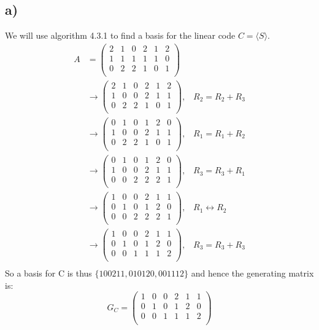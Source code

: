 \documentclass{article}
\begin{document}
\subsection*{a)}
We will use algorithm 4.3.1 to find a basis for the linear code $C=\langle S\rangle$.
\begin{align*}
A&=\begin{pmatrix}
2 &1&0&2&1&2\\
1&1&1&1&1&0\\
0&2&2&1&0&1\\
\end{pmatrix}\\
&\rightarrow \begin{pmatrix}
2 &1&0&2&1&2\\
1&0&0&2&1&1\\
0&2&2&1&0&1\\
\end{pmatrix},\;\;\;R_2=R_2+R_3\\
&\rightarrow \begin{pmatrix}
0 &1&0&1&2&0\\
1&0&0&2&1&1\\
0&2&2&1&0&1\\
\end{pmatrix},\;\;\;R_1=R_1+R_2\\
&\rightarrow \begin{pmatrix}
0 &1&0&1&2&0\\
1&0&0&2&1&1\\
0&0&2&2&2&1\\
\end{pmatrix},\;\;\;R_3=R_3+R_1\\
&\rightarrow \begin{pmatrix}
1&0&0&2&1&1\\
0&1&0&1&2&0\\
0&0&2&2&2&1\\
\end{pmatrix},\;\;\;R_1\leftrightarrow R_2\\
&\rightarrow \begin{pmatrix}
1&0&0&2&1&1\\
0&1&0&1&2&0\\
0&0&1&1&1&2\\
\end{pmatrix},\;\;\;R_3=R_3+R_3\\
\end{align*}
So a basis for C is thus $\{100211,010120,001112\}$ and hence the generating matrix is:
$$G_C=\begin{pmatrix}
1&0&0&2&1&1\\
0&1&0&1&2&0\\
0&0&1&1&1&2\\
\end{pmatrix}$$
\end{document}
